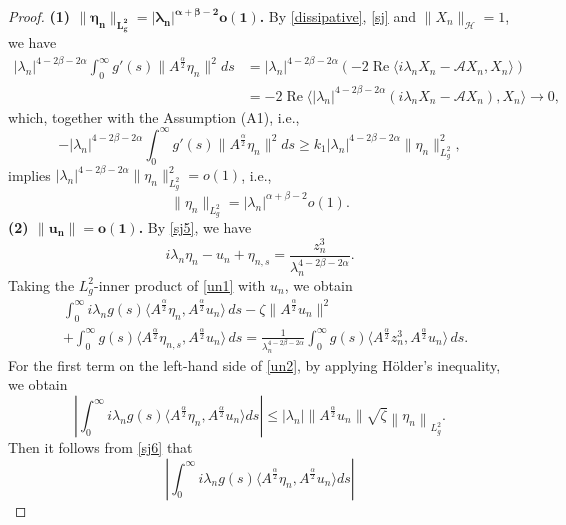 \documentclass[10pt,a4paper]{amsart}
\begin{document}
\begin{proof}
{\bf \noindent(1) $\bm{\|\eta_n\|_{L_g^2}=|\lambda_n|^{\alpha + \beta - 2}o(1)}$.}
		By \eqref{dissipative}, \eqref{sj} and $\|X_n\|_{\mathcal{H}}=1$, we have
		\begin{align*}
			|\lambda_n|^{4 - 2\beta - 2\alpha} \int_0^\infty g'(s) \|A^{\frac{\alpha}{2}} \eta_n\|^2 ds
			&= |\lambda_n|^{4 - 2\beta - 2\alpha}  \left(-2\operatorname{Re} \langle i\lambda_n X_n -\mathcal{A} X_n, X_n \rangle\right) \\
			&= -2\operatorname{Re} \langle |\lambda_n|^{4 - 2\beta - 2\alpha} (i\lambda_n X_n - \mathcal{A} X_n), X_n \rangle \to 0,
		\end{align*}
which, together with the Assumption (A1), i.e.,
		\[
-|\lambda_n|^{4 - 2\beta - 2\alpha} \int_0^\infty g'(s) \|A^{\frac{\alpha}{2}} \eta_n\|^2 ds
		\geq k_1 |\lambda_n|^{4 - 2\beta - 2\alpha} \|\eta_n\|_{L_g^2}^2,
		\]
implies $|\lambda_n|^{4 - 2\beta - 2\alpha}\|\eta_n\|_{L_g^2}^2 =o(1)$,  i.e.,
		\begin{equation}\label{sj6}
			\|\eta_n\|_{L_g^2} =|\lambda_n|^{\alpha + \beta - 2} o(1).
		\end{equation}
		{\bf \noindent(2) $\bm{\|u_n\|=o(1)}$.} By \eqref{sj5}, we have
		\begin{equation}\label{un1}
			i\lambda_n \eta_n - u_n + \eta_{n,s} = \frac{z_n^3}{\lambda_n^{4 - 2\beta - 2\alpha}}.
		\end{equation}
Taking the $L_g^2$-inner product of \eqref{un1} with $u_n$, we obtain
		\begin{align}\label{un2}
			&\int_0^\infty i\lambda_n g(s)\langle A^{\frac{\alpha}{2}}\eta_n, A^{\frac{\alpha}{2}}u_n \rangle \, ds
			- \zeta\|A^{\frac{\alpha}{2}}u_n\|^2  \nonumber \\
			&+ \int_0^\infty g(s)\langle A^{\frac{\alpha}{2}}\eta_{n,s}, A^{\frac{\alpha}{2}}u_n \rangle \, ds
			= \frac{1}{\lambda_n^{4-2\beta-2\alpha}}
			\int_0^\infty g(s)\langle A^{\frac{\alpha}{2}}z_n^3, A^{\frac{\alpha}{2}}u_n \rangle \, ds.
		\end{align}
		For the first term on the left-hand side of \eqref{un2}, by applying H\"older's inequality, we obtain
\[\left| \int_0^\infty i\lambda_n g(s) \langle A^{\frac{\alpha}{2}} \eta_n, A^{\frac{\alpha}{2}} u_n \rangle ds \right|
			\leq |\lambda_n| \| A^{\frac{\alpha}{2}} u_n \| \sqrt{\zeta} \left\| \eta_n \right\|_{L_g^2}.\]
Then it follows from \eqref{sj6} that
		\begin{equation}\label{un3}
			\left| \int_0^\infty i\lambda_n g(s) \langle A^{\frac{\alpha}{2}} \eta_n, A^{\frac{\alpha}{2}} u_n \rangle ds \right|

\end{equation}
\end{proof}
\end{document}
